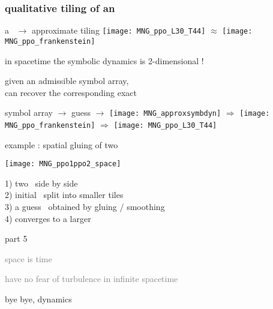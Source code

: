 \begin{frame}%
  \frametitle{qualitative tiling of an \twot}
  \begin{block} {a \twot\ $\to$ approximate tiling}
  \qquad\qquad\qquad
  \texttt{[image: MNG\_ppo\_L30\_T44]}
  \quad $\approx$ \quad
  \texttt{[image: MNG\_ppo\_frankenstein]}
  \end{block}
\end{frame}

\begin{frame}{in spacetime the symbolic dynamics is 2-dimensional !}

given an admissible symbol array, \\
can recover the corresponding exact \twot

\bigskip

  \begin{block} {symbol array $\to$ guess $\to$ \twot}
  \texttt{[image: MNG\_approxsymbdyn]}
  \quad $\Rightarrow$ %
  \texttt{[image: MNG\_ppo\_frankenstein]}
  \quad $\Rightarrow$ %
  \texttt{[image: MNG\_ppo\_L30\_T44]}
  \end{block}
\end{frame}


\begin{frame}{example : spatial gluing of two \twots}
{\centering
\begin{minipage}[height=.1\textheight]{.8\textwidth}
\texttt{[image: MNG\_ppo1ppo2\_space]}
\end{minipage}
}

1) two \twots\ side by side
\\
2) initial \twots\ split into smaller tiles
\\
3) a guess \twot\ obtained by gluing / smoothing
\\
4) converges to a larger \twot
\end{frame}

\begin{frame}{part 5}
\begin{enumerate}
              \item
    \textcolor{gray}{\small
space is time
              \item
have no fear of turbulence in infinite spacetime
    }
              \item
    {\Large
bye bye, dynamics
    }
            \end{enumerate}
\end{frame}

